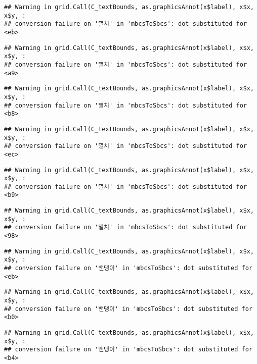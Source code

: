 \documentclass[
]{article}
\begin{document}
\begin{verbatim}
## Warning in grid.Call(C_textBounds, as.graphicsAnnot(x$label), x$x, x$y, :
## conversion failure on '멸치' in 'mbcsToSbcs': dot substituted for <eb>
\end{verbatim}

\begin{verbatim}
## Warning in grid.Call(C_textBounds, as.graphicsAnnot(x$label), x$x, x$y, :
## conversion failure on '멸치' in 'mbcsToSbcs': dot substituted for <a9>
\end{verbatim}

\begin{verbatim}
## Warning in grid.Call(C_textBounds, as.graphicsAnnot(x$label), x$x, x$y, :
## conversion failure on '멸치' in 'mbcsToSbcs': dot substituted for <b8>
\end{verbatim}

\begin{verbatim}
## Warning in grid.Call(C_textBounds, as.graphicsAnnot(x$label), x$x, x$y, :
## conversion failure on '멸치' in 'mbcsToSbcs': dot substituted for <ec>
\end{verbatim}

\begin{verbatim}
## Warning in grid.Call(C_textBounds, as.graphicsAnnot(x$label), x$x, x$y, :
## conversion failure on '멸치' in 'mbcsToSbcs': dot substituted for <b9>
\end{verbatim}

\begin{verbatim}
## Warning in grid.Call(C_textBounds, as.graphicsAnnot(x$label), x$x, x$y, :
## conversion failure on '멸치' in 'mbcsToSbcs': dot substituted for <98>
\end{verbatim}

\begin{verbatim}
## Warning in grid.Call(C_textBounds, as.graphicsAnnot(x$label), x$x, x$y, :
## conversion failure on '밴댕이' in 'mbcsToSbcs': dot substituted for <eb>
\end{verbatim}

\begin{verbatim}
## Warning in grid.Call(C_textBounds, as.graphicsAnnot(x$label), x$x, x$y, :
## conversion failure on '밴댕이' in 'mbcsToSbcs': dot substituted for <b0>
\end{verbatim}

\begin{verbatim}
## Warning in grid.Call(C_textBounds, as.graphicsAnnot(x$label), x$x, x$y, :
## conversion failure on '밴댕이' in 'mbcsToSbcs': dot substituted for <b4>
\end{verbatim}
\end{document}
